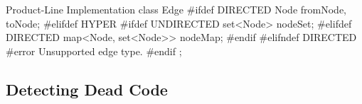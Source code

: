 \begin{frame}[fragile]{\myframetitle}
\begin{mycolumns}[columns=3,widths={40,23,37},animation=none]
\begin{cpptight}[basicstyle=\small]{Product-Line Implementation}
class Edge {
#ifdef DIRECTED
	Node fromNode, toNode;
#elifdef HYPER
#ifdef UNDIRECTED
	set<Node> nodeSet;
#elifdef DIRECTED
	map<Node, set<Node>> nodeMap;
#endif
#elifndef DIRECTED
#error Unsupported edge type.
#endif
};
		\end{cpptight}
	\end{mycolumns}
\end{frame}

\subsection{Detecting Dead Code}

\begin{frame}[fragile]{\myframetitle}
	\begin{mycolumns}[columns=3,widths={40,23,37},animation=none]
\end{mycolumns}
\end{frame}
